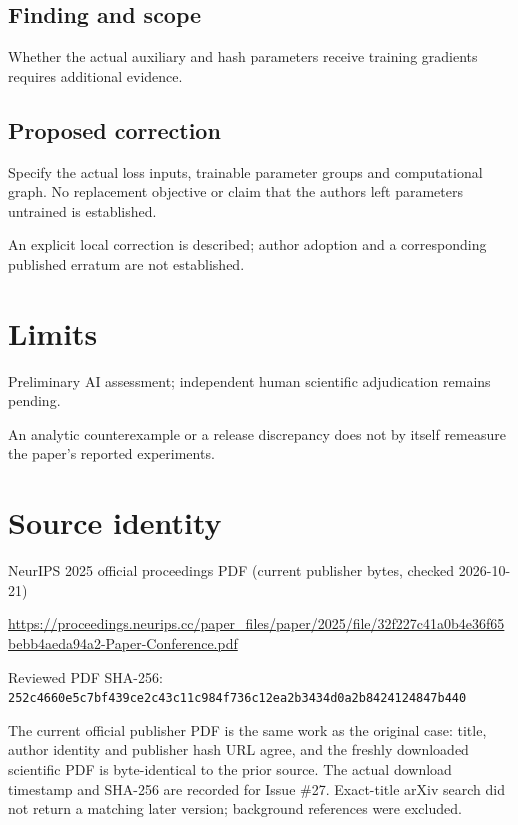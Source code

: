\documentclass[11pt]{article}
\begin{document}
\subsection*{Finding and scope}

Whether the actual auxiliary and hash parameters receive training gradients requires additional evidence.

\subsection*{Proposed correction}

Specify the actual loss inputs, trainable parameter groups and computational graph. No replacement objective or claim that the authors left parameters untrained is established.

An explicit local correction is described; author adoption and a corresponding published erratum are not established.

\section*{Limits}

Preliminary AI assessment; independent human scientific adjudication remains pending.\par

An analytic counterexample or a release discrepancy does not by itself remeasure the paper’s reported experiments.\par

\section*{Source identity}

NeurIPS 2025 official proceedings PDF (current publisher bytes, checked 2026-10-21)

\url{https://proceedings.neurips.cc/paper_files/paper/2025/file/32f227c41a0b4e36f65bebb4aeda94a2-Paper-Conference.pdf}

Reviewed PDF SHA-256: \nolinkurl{252c4660e5c7bf439ce2c43c11c984f736c12ea2b3434d0a2b8424124847b440}

The current official publisher PDF is the same work as the original case: title, author identity and publisher hash URL agree, and the freshly downloaded scientific PDF is byte-identical to the prior source. The actual download timestamp and SHA-256 are recorded for Issue \#27. Exact-title arXiv search did not return a matching later version; background references were excluded.
\end{document}
